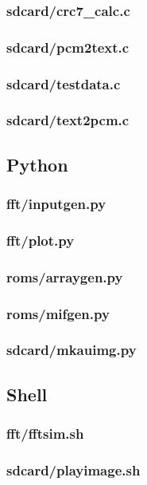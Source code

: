 \documentclass{article}
\begin{document}
	\subsubsection{sdcard/crc7\_calc.c}
	
	\subsubsection{sdcard/pcm2text.c}
	
	\subsubsection{sdcard/testdata.c}
	
	\subsubsection{sdcard/text2pcm.c}
	

\subsection{Python} %
	\subsubsection{fft/inputgen.py}
	
	\subsubsection{fft/plot.py}
	
	\subsubsection{roms/arraygen.py}
	
	\subsubsection{roms/mifgen.py}
	
	\subsubsection{sdcard/mkauimg.py}
	

\subsection{Shell}
	\subsubsection{fft/fftsim.sh}
	
	\subsubsection{sdcard/playimage.sh}
	
 
\end{document}
